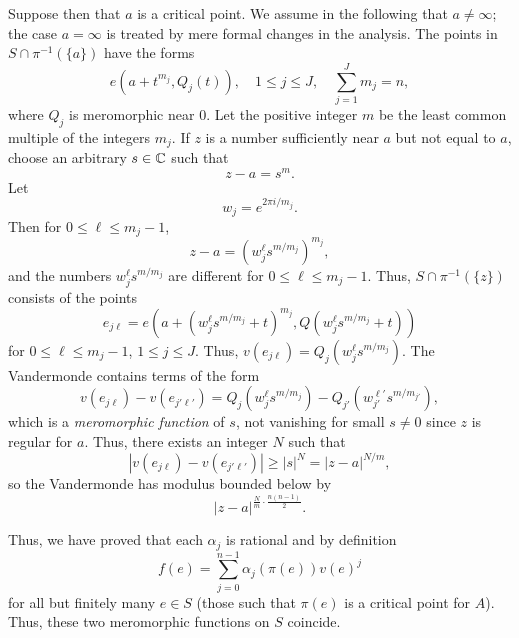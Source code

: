 \documentclass[a4paper,11pt]{article}
\begin{document}
\begin{myproof}
  Suppose then that $a$ is a critical point.  We assume in the
  following that $a \ne \infty$; the case $a = \infty$ is treated by
  mere formal changes in the analysis.  The points in $S \cap
  \pi^{-1}(\{a\})$ have the forms
  $$
  e(a + t^{m_j}, Q_j(t)), \quad 1 \le j \le J, \quad 
  \sum_{j=1}^{J} m_j = n,
  $$
  where $Q_j$ is meromorphic near 0.  Let the positive integer $m$ be
  the least common multiple of the integers $m_j$.  If $z$ is a number
  sufficiently near $a$ but not equal to $a$, choose an arbitrary $s
  \in {\mathbb C}$ such that
  $$
  z - a = s^m.
  $$
  Let
  $$
  w_j = e^{2\pi i/m_j}.
  $$
  Then for $0 \le \ell \le m_j-1$,
  $$
  z -a = (w_j^\ell s^{m/m_j})^{m_j},
  $$
  and the numbers $w_j^\ell s^{m/m_j}$ are different for $0 \le \ell
  \le m_j - 1$.  Thus, $S \cap \pi^{-1}(\{z\})$ consists of the points
  $$
  e_{j\ell} = e(a + (w_j^\ell s^{m/m_j} + t)^{m_j}, 
  Q(w_j^\ell s^{m/m_j} + t))
  $$
  for $0 \le \ell \le m_j -1$, $1 \le j \le J$.  Thus, $v(e_{j\ell}) =
  Q_j(w_j^\ell s^{m/m_j})$.  The Vandermonde contains terms of the
  form
  $$
  v(e_{j\ell}) - v(e_{j'\ell'}) 
  = Q_j(w_j^{\ell} s^{m/m_j}) - Q_{j'}(w_{j'}^{\ell'} s^{m/m_{j'}}),
  $$
  which is a \emph{meromorphic function} of $s$, not vanishing for
  small $s \ne 0$ since $z$ is regular for $a$.  Thus, there exists
  an integer $N$ such that
  $$
  |v(e_{j\ell}) - v(e_{j'\ell'})| \ge |s|^N = |z-a|^{N/m},
  $$
  so the Vandermonde has modulus bounded below by
  $$
  |z-a|^{\frac{N}{m}\cdot \frac{n(n-1)}{2}}.
  $$

  Thus, we have proved that each $\alpha_j$ is rational and by
  definition
  $$
  f(e) = \sum_{j=0}^{n-1} \alpha_j(\pi(e)) v(e)^j
  $$
  for all but finitely many $e \in S$ (those such that $\pi(e)$ is a
  critical point for $A$). Thus, these two meromorphic functions on
  $S$ coincide.
\end{myproof}
\end{document}
